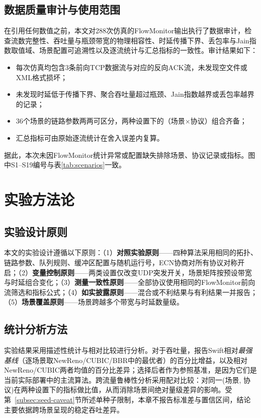 \subsection{数据质量审计与使用范围}
\label{subsec:audit}

在引用任何数值之前，本文对288次仿真的FlowMonitor输出执行了数据审计，检查流数完整性、吞吐量与瓶颈带宽的物理相容性、时延传播下界、丢包率与Jain指数取值域、场景配置可追溯性以及逐流统计与汇总指标的一致性。审计结果如下：

\begin{itemize}
\item 每次仿真均包含3条前向TCP数据流与对应的反向ACK流，未发现空文件或XML格式损坏；
\item 未发现时延低于传播下界、聚合吞吐量超过瓶颈、Jain指数越界或丢包率越界的记录；
\item 36个场景的链路参数两两可区分，两种设置下的（场景$\times$协议）组合齐备；
\item 汇总指标可由原始逐流统计在舍入误差内复算。
\end{itemize}

据此，本次未因FlowMonitor统计异常或配置缺失排除场景、协议记录或指标。图中S1--S19编号与表\ref{tab:scenarios}一致。

\section{实验方法论}

\subsection{实验设计原则}

本文的实验设计遵循以下原则：（1）\textbf{对照实验原则}——四种算法采用相同的拓扑、链路参数、队列规则、缓冲区配置与随机运行号，ECN协商对所有协议对称开启；（2）\textbf{变量控制原则}——两类设置仅改变UDP突发开关，场景矩阵按预设带宽与时延组合变化；（3）\textbf{测量一致性原则}——全部协议使用相同的FlowMonitor前向流筛选和指标公式；（4）\textbf{如实披露原则}——混合或不利结果与有利结果一并报告；（5）\textbf{场景覆盖原则}——场景跨越多个带宽与时延数量级。

\subsection{统计分析方法}

实验结果采用描述性统计与相对比较进行分析。对于吞吐量，报告Swift相对\emph{最强基线}（逐场景取NewReno/CUBIC/BBR中的最优者）的百分比增益，以及相对NewReno/CUBIC两者均值的百分比差异；选择后者作为参照基准，是因为它们是当前实际部署中的主流算法。跨流量鲁棒性分析采用配对比较：对同一(场景, 协议)在两种设置下的指标做比值，从而消除场景间绝对量级差异的影响。受第~\ref{subsec:seed-caveat}节所述单种子限制，本章不报告标准差与置信区间，结论主要依据跨场景呈现的稳定吞吐差异。

